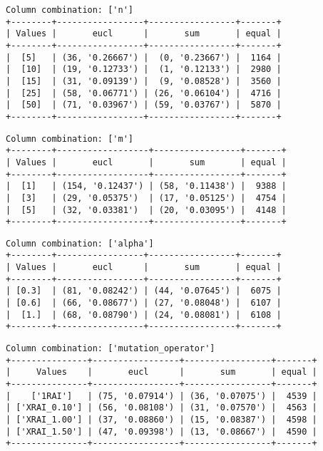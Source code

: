 \documentclass{article}
\begin{document}
\begin{verbatim}
Column combination: ['n']
+--------+-----------------+-----------------+-------+
| Values |       eucl      |       sum       | equal |
+--------+-----------------+-----------------+-------+
|  [5]   | (36, '0.26667') |  (0, '0.23667') |  1164 |
|  [10]  | (19, '0.12733') |  (1, '0.12133') |  2980 |
|  [15]  | (31, '0.09139') |  (9, '0.08528') |  3560 |
|  [25]  | (58, '0.06771') | (26, '0.06104') |  4716 |
|  [50]  | (71, '0.03967') | (59, '0.03767') |  5870 |
+--------+-----------------+-----------------+-------+
\end{verbatim}

\begin{verbatim}
Column combination: ['m']
+--------+------------------+-----------------+-------+
| Values |       eucl       |       sum       | equal |
+--------+------------------+-----------------+-------+
|  [1]   | (154, '0.12437') | (58, '0.11438') |  9388 |
|  [3]   | (29, '0.05375')  | (17, '0.05125') |  4754 |
|  [5]   | (32, '0.03381')  | (20, '0.03095') |  4148 |
+--------+------------------+-----------------+-------+
\end{verbatim}

\begin{verbatim}
Column combination: ['alpha']
+--------+-----------------+-----------------+-------+
| Values |       eucl      |       sum       | equal |
+--------+-----------------+-----------------+-------+
| [0.3]  | (81, '0.08242') | (44, '0.07645') |  6075 |
| [0.6]  | (66, '0.08677') | (27, '0.08048') |  6107 |
|  [1.]  | (68, '0.08790') | (24, '0.08081') |  6108 |
+--------+-----------------+-----------------+-------+
\end{verbatim}

\begin{verbatim}
Column combination: ['mutation_operator']
+---------------+-----------------+-----------------+-------+
|     Values    |       eucl      |       sum       | equal |
+---------------+-----------------+-----------------+-------+
|    ['1RAI']   | (75, '0.07914') | (36, '0.07075') |  4539 |
| ['XRAI_0.10'] | (56, '0.08108') | (31, '0.07570') |  4563 |
| ['XRAI_1.00'] | (37, '0.08860') | (15, '0.08387') |  4598 |
| ['XRAI_1.50'] | (47, '0.09398') | (13, '0.08667') |  4590 |
+---------------+-----------------+-----------------+-------+
\end{verbatim}
\end{document}
